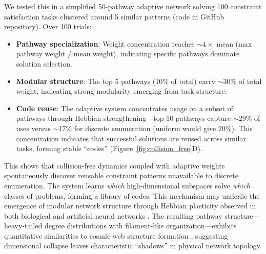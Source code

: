 \documentclass[12pt]{article}
\begin{document}
We tested this in a simplified 50-pathway adaptive network solving 100 constraint satisfaction tasks clustered around 5 similar patterns (code in GitHub repository). Over 100 trials:
\begin{itemize}
\item \textbf{Pathway specialization}: Weight concentration reaches $\sim 4\times$ mean (max pathway weight / mean weight), indicating specific pathways dominate solution selection.
\item \textbf{Modular structure}: The top 5 pathways (10\% of total) carry $\sim 30\%$ of total weight, indicating strong modularity emerging from task structure.
\item \textbf{Code reuse}: The adaptive system concentrates usage on a subset of pathways through Hebbian strengthening---top 10 pathways capture $\sim$29\% of uses versus $\sim$17\% for discrete enumeration (uniform would give 20\%). This concentration indicates that successful solutions are reused across similar tasks, forming stable ``codes'' (Figure~\ref{fig:collision_free}D).
\end{itemize}

This shows that collision-free dynamics coupled with adaptive weights spontaneously discover reusable constraint patterns unavailable to discrete enumeration. The system learns \textit{which} high-dimensional subspaces solve \textit{which} classes of problems, forming a library of codes. This mechanism may underlie the emergence of modular network structure through Hebbian plasticity observed in both biological and artificial neural networks \cite{hebbian_modularity}. The resulting pathway structure---heavy-tailed degree distributions with filament-like organization---exhibits quantitative similarities to cosmic web structure formation \cite{vazza2020}, suggesting dimensional collapse leaves characteristic ``shadows'' in physical network topology.
\end{document}
